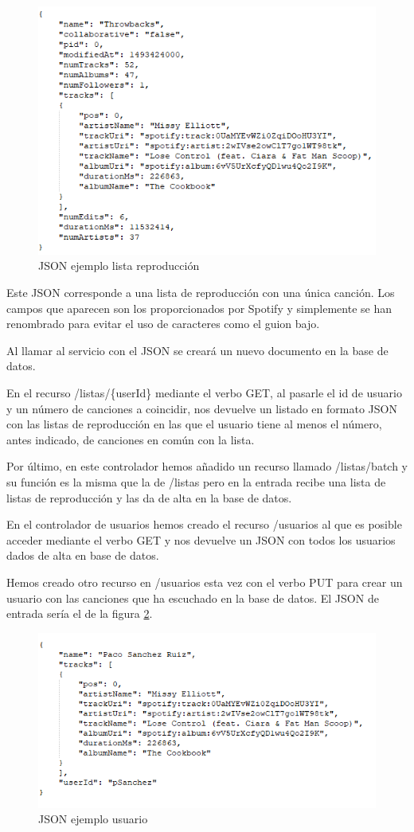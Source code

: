 \documentclass[12pt]{report} %
\begin{document}
\begin{figure}
	\centering
	\includegraphics[width=0.7\linewidth]{imagenes/jsonLista}
	\caption{JSON ejemplo lista reproducción}
	\label{fig:jsonlista}
\end{figure}


Este JSON corresponde a una lista de reproducción con una única canción. Los campos que aparecen son los proporcionados por Spotify y simplemente se han renombrado para evitar el uso de caracteres como el guion bajo.

Al llamar al servicio con el JSON se creará un nuevo documento en la base de datos.

En el recurso /listas/\{userId\} mediante el verbo GET, al pasarle el id de usuario y un número de canciones a coincidir, nos devuelve un listado en formato JSON con las listas de reproducción en las que el usuario tiene al menos el número, antes indicado, de canciones en común con la lista.

Por último, en este controlador hemos añadido un recurso llamado /listas/batch y su función es la misma que la de /listas pero en la entrada recibe una lista de listas de reproducción y las da de alta en la base de datos.


En el controlador de usuarios hemos creado el recurso /usuarios al que es posible acceder mediante el verbo GET y nos devuelve un JSON con todos los usuarios dados de alta en base de datos.

Hemos creado otro recurso en /usuarios esta vez con el verbo PUT para crear un usuario con las canciones que ha escuchado en la base de datos. El JSON de entrada sería el de la figura \ref{fig:jsonusuario}.

\begin{figure}
	\centering
	\includegraphics[width=0.7\linewidth]{imagenes/jsonUsuario}
	\caption{JSON ejemplo usuario}
	\label{fig:jsonusuario}
\end{figure}
\end{document}
